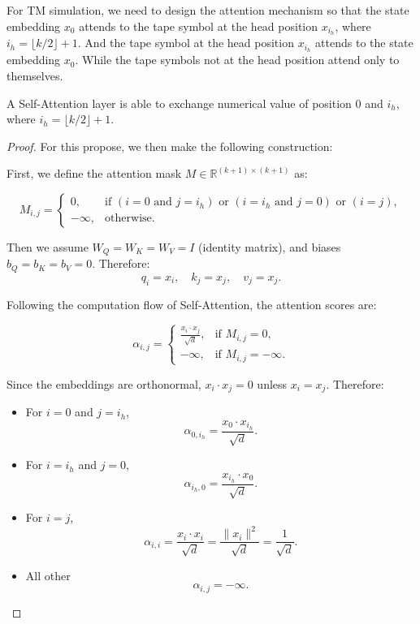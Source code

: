 {For TM simulation, we need to design the attention mechanism so that
  the state embedding \( x_0 \) attends to the tape symbol at the head position \( x_{i_h} \), where \( i_h = \lfloor k/2 \rfloor + 1 \). And the tape symbol at the head position \( x_{i_h} \) attends to the state embedding \( x_0 \).
  While the tape symbols not at the head position attend only to themselves. 
  
\begin{lemma}
    A Self-Attention layer is able to exchange numerical value of position \(0\) and \(i_h\), where \(i_h=\lfloor k/2 \rfloor + 1\).
\end{lemma}

\begin{proof}
    For this propose, we then make the following construction:

First, we define the attention mask \( M \in \mathbb{R}^{(k+1) \times (k+1)} \) as:

\[
M_{i,j} = \begin{cases}
0, & \text{if } (i=0 \text{ and } j=i_h) \text{ or } (i=i_h \text{ and } j=0) \text{ or } (i=j), \\
-\infty, & \text{otherwise}.
\end{cases}
\]

Then we assume \( W_Q = W_K = W_V = I \) (identity matrix), and biases \( b_Q = b_K = b_V = 0 \). Therefore:
\[
q_i = x_i, \quad k_j = x_j, \quad v_j = x_j.
\]

Following the computation flow of Self-Attention, the attention scores are:

\[
\alpha_{i,j} = \begin{cases}
\frac{x_i \cdot x_j}{\sqrt{d}}, & \text{if } M_{i,j} = 0, \\
-\infty, & \text{if } M_{i,j} = -\infty.
\end{cases}
\]

Since the embeddings are orthonormal, \( x_i \cdot x_j = 0 \) unless \( x_i = x_j \). Therefore:
\begin{itemize}
    \item For \( i = 0 \) and \( j = i_h \), \[ \alpha_{0,i_h} = \frac{x_0 \cdot x_{i_h}}{\sqrt{d}}. \]
    \item For \( i = i_h \) and \( j = 0 \), \[ \alpha_{i_h,0} = \frac{x_{i_h} \cdot x_0}{\sqrt{d}}. \]
    \item For \( i = j \), \[ \alpha_{i,i} = \frac{x_i \cdot x_i}{\sqrt{d}} = \frac{\| x_i \|^2}{\sqrt{d}} = \frac{1}{\sqrt{d}}. \]
    \item All other \[ \alpha_{i,j} = -\infty. \]
\end{itemize}


\end{proof}}
